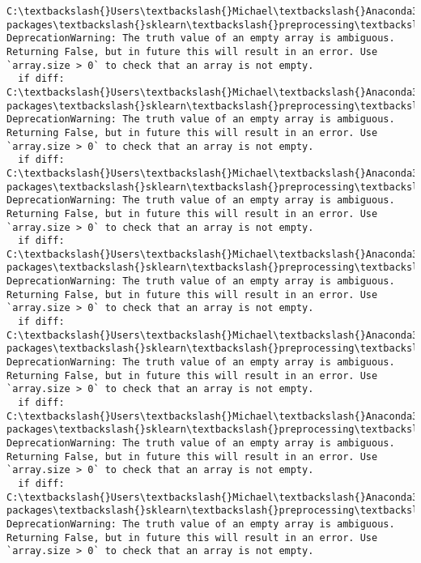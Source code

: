 \documentclass[11pt]{article}
\begin{document}
    \begin{Verbatim}[commandchars=\\\{\}]
C:\textbackslash{}Users\textbackslash{}Michael\textbackslash{}Anaconda3.2\textbackslash{}lib\textbackslash{}site-packages\textbackslash{}sklearn\textbackslash{}preprocessing\textbackslash{}label.py:151: DeprecationWarning: The truth value of an empty array is ambiguous. Returning False, but in future this will result in an error. Use `array.size > 0` to check that an array is not empty.
  if diff:
C:\textbackslash{}Users\textbackslash{}Michael\textbackslash{}Anaconda3.2\textbackslash{}lib\textbackslash{}site-packages\textbackslash{}sklearn\textbackslash{}preprocessing\textbackslash{}label.py:151: DeprecationWarning: The truth value of an empty array is ambiguous. Returning False, but in future this will result in an error. Use `array.size > 0` to check that an array is not empty.
  if diff:
C:\textbackslash{}Users\textbackslash{}Michael\textbackslash{}Anaconda3.2\textbackslash{}lib\textbackslash{}site-packages\textbackslash{}sklearn\textbackslash{}preprocessing\textbackslash{}label.py:151: DeprecationWarning: The truth value of an empty array is ambiguous. Returning False, but in future this will result in an error. Use `array.size > 0` to check that an array is not empty.
  if diff:
C:\textbackslash{}Users\textbackslash{}Michael\textbackslash{}Anaconda3.2\textbackslash{}lib\textbackslash{}site-packages\textbackslash{}sklearn\textbackslash{}preprocessing\textbackslash{}label.py:151: DeprecationWarning: The truth value of an empty array is ambiguous. Returning False, but in future this will result in an error. Use `array.size > 0` to check that an array is not empty.
  if diff:
C:\textbackslash{}Users\textbackslash{}Michael\textbackslash{}Anaconda3.2\textbackslash{}lib\textbackslash{}site-packages\textbackslash{}sklearn\textbackslash{}preprocessing\textbackslash{}label.py:151: DeprecationWarning: The truth value of an empty array is ambiguous. Returning False, but in future this will result in an error. Use `array.size > 0` to check that an array is not empty.
  if diff:
C:\textbackslash{}Users\textbackslash{}Michael\textbackslash{}Anaconda3.2\textbackslash{}lib\textbackslash{}site-packages\textbackslash{}sklearn\textbackslash{}preprocessing\textbackslash{}label.py:151: DeprecationWarning: The truth value of an empty array is ambiguous. Returning False, but in future this will result in an error. Use `array.size > 0` to check that an array is not empty.
  if diff:
C:\textbackslash{}Users\textbackslash{}Michael\textbackslash{}Anaconda3.2\textbackslash{}lib\textbackslash{}site-packages\textbackslash{}sklearn\textbackslash{}preprocessing\textbackslash{}label.py:151: DeprecationWarning: The truth value of an empty array is ambiguous. Returning False, but in future this will result in an error. Use `array.size > 0` to check that an array is not empty.

\end{Verbatim}
\end{document}
